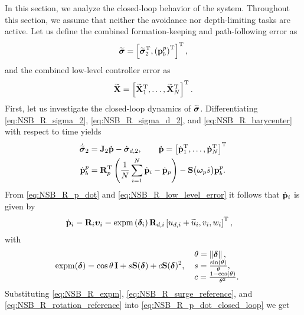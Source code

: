 In this section, we analyze the closed-loop behavior of the system.
Throughout this section, we assume that neither the avoidance nor depth-limiting tasks are active.
Let us define the combined formation-keeping and path-following error as 
\begin{equation}
    \widetilde{\bm{\sigma}} = \left[\widetilde{\bm{\sigma}}_2^{\mathrm{T}}, \left(\mathbf{p}_b^p\right)^{\mathrm{T}}\right]^{\mathrm{T}},
\end{equation}
and the combined low-level controller error as
\begin{equation}
    \widetilde{\mathbf{X}} = \left[\widetilde{\mathbf{X}}_1^{\mathrm{T}}, \ldots, \widetilde{\mathbf{X}}_N^{\mathrm{T}}\right]^{\mathrm{T}}.
\end{equation}
First, let us investigate the closed-loop dynamics of $\widetilde{\bm{\sigma}}$.
Differentiating \eqref{eq:NSB_R_sigma_2}, \eqref{eq:NSB_R_sigma_d_2}, and \eqref{eq:NSB_R_barycenter} with respect to time yields 
\begin{subequations}
\begin{align}
    \dot{\widetilde{\bm{\sigma}}}_2 &= \mathbf{J}_2\dot{\mathbf{p}} - \dot{\bm{\sigma}}_{d, 2}, \qquad \dot{\mathbf{p}} = \left[\dot{\mathbf{p}}_1^{\mathrm{T}}, \ldots, \dot{\mathbf{p}}_N^{\mathrm{T}}\right]^{\mathrm{T}} \\
    \dot{\mathbf{p}}_b^p &= \mathbf{R}_p^{\mathrm{T}}\left(\frac{1}{N}\sum_{i=1}^N\dot{\mathbf{p}}_i - \dot{\mathbf{p}}_p\right) - \mathbf{S}\big(\bm{\omega}_p\dot{s}\big)\mathbf{p}_b^p.
\end{align} \label{eq:NSB_R_dot_sigma_tilde}
\end{subequations}
From \eqref{eq:NSB_R_p_dot} and \eqref{eq:NSB_R_low_level_error} it follows that $\dot{\mathbf{p}}_i$ is given by 
\begin{align}
    \dot{\mathbf{p}}_i &= \mathbf{R}_i\bm{\upsilon}_i = {\rm expm}\left(\bm{\delta}_i\right)\mathbf{R}_{d, i}\left[u_{d, i} + \widetilde{u}_i, v_i, w_i\right]^{\mathrm{T}}, \label{eq:NSB_R_p_dot_closed_loop}
\end{align}
with 
\begin{align}
    {\rm expm}(\bs{\delta}) &= \cos\theta\,\mat{I} + s\mat{S}(\bs{\delta}) + c\mat{S}(\bs{\delta})^2\mathrlap{,} &
    &\begin{array}{l}
    \scale[1]{\theta = \norm{\bs{\delta}},} \\
    \scale[1]{s = \frac{\sin(\theta)}{\theta},} \\
    \scale[1]{c = \frac{1 - \cos(\theta)}{\theta^2}.}
    \end{array} \label{eq:NSB_R_expm}
\end{align}
Substituting \eqref{eq:NSB_R_expm}, \eqref{eq:NSB_R_surge_reference}, and \eqref{eq:NSB_R_rotation_reference} into \eqref{eq:NSB_R_p_dot_closed_loop} we get 
